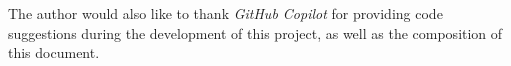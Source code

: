 The author would also like to thank \textit{GitHub Copilot}
for providing code suggestions during the development of this project,
as well as the composition of this document.
